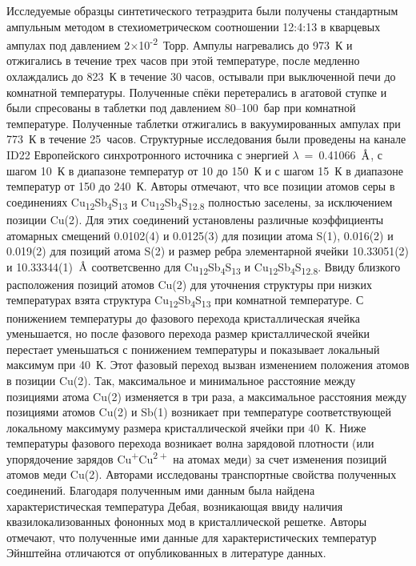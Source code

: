 Исследуемые образцы синтетического тетраэдрита были получены стандартным ампульным методом в стехиометрическом соотношении 12:4:13 в кварцевых ампулах под давлением 2$\times$10\textsuperscript{-2}~Торр. Ампулы нагревались до 973~К и отжигались в течение трех часов при этой температуре, после медленно охлаждались до 823~К в течение 30 часов, остывали при выключенной печи до комнатной температуры. Полученные спёки перетерались в агатовой ступке и были спресованы в таблетки под давлением 80--100~бар при комнатной температуре. Полученные таблетки отжигались в вакуумированных ампулах при 773~К в течение 25~часов. Структурные исследования были проведены на канале ID22 Европейского синхротронного источника с энергией $\lambda$~=~0.41066~$\mbox{\normalfont\AA}$, с шагом 10~К в диапазоне температур от 10 до 150~К и с шагом 15~К в диапазоне температур от 150 до 240~К. Авторы отмечают, что все позиции атомов серы в соединениях Cu\textsubscript{12}Sb\textsubscript{4}S\textsubscript{13} и Cu\textsubscript{12}Sb\textsubscript{4}S\textsubscript{12.8} полностью заселены, за исключением позиции Cu(2). Для этих соединений установлены различные коэффициенты атомарных смещений 0.0102(4) и 0.0125(3) для позиции атома S(1), 0.016(2) и 0.019(2) для позиций атома S(2) и размер ребра элементарной ячейки 10.33051(2) и 10.33344(1)~$\mbox{\normalfont\AA}$ соответсвенно для Cu\textsubscript{12}Sb\textsubscript{4}S\textsubscript{13} и Cu\textsubscript{12}Sb\textsubscript{4}S\textsubscript{12.8}. Ввиду близкого расположения позиций атомов Cu(2) для уточнения структуры при низких температурах взята структура Cu\textsubscript{12}Sb\textsubscript{4}S\textsubscript{13}  при комнатной температуре. С понижением температуры до фазового перехода кристаллическая ячейка уменьшается, но после фазового перехода размер кристаллической ячейки перестает уменьшаться с понижением температуры и показывает локальный максимум при 40~К. Этот фазовый переход вызван изменением положения атомов в позиции Cu(2). Так, максимальное и минимальное расстояние между позициями атома Cu(2) изменяется в три раза, а максимальное расстояния между позициями атомов Cu(2) и Sb(1) возникает при температуре соответствующей локальному максимуму размера кристаллической ячейки при 40~К. Ниже температуры фазового перехода возникает волна зарядовой плотности (или упорядочение зарядов Cu\textsuperscript{$+$}Cu\textsuperscript{$2+$} на атомах меди) за счет изменения позиций атомов меди Cu(2). Авторами исследованы транспортные свойства полученных соединений. Благодаря полученным ими данным была найдена характеристическая температура Дебая, возникающая ввиду наличия квазилокализованных фононных мод в кристаллической решетке. Авторы отмечают, что полученные ими данные для характеристических температур Эйнштейна отличаются от опубликованных в литературе данных\cite{Lara-Curzio2014}.

